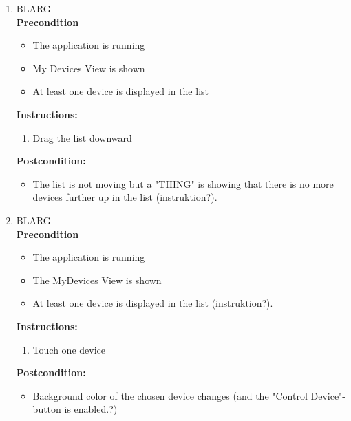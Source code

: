 \documentclass[a4paper]{article}
\newlength{\testlabellength}
\newenvironment{testlist}{\begin{enumerate}[label=\bfseries Instruction \thesubsection.\arabic* , labelindent=0pt, labelwidth=\testlabellength , leftmargin=2cm]}{\end{enumerate}}
\newenvironment{precondition}{
{\color{white}BLARG}\\ 
\textbf{Precondition}
\begin{itemize}[labelindent=0cm, labelwidth=2cm , leftmargin=1cm]
}
{\end{itemize}}
\newenvironment{instruction}{
\textbf{Instructions:}
\begin{enumerate}[label=\bfseries  \arabic*., labelindent=0cm, labelwidth=2cm , leftmargin=1cm]
}
{\end{enumerate}}
\newenvironment{postcondition}{
\textbf{Postcondition:}
\begin{itemize}[labelindent=0cm, labelwidth=2cm , leftmargin=1cm]
}
{\end{itemize}}
\begin{document}
\begin{appendices}
\begin{testlist}
    \item	
    	\begin{precondition}
    		\item The application is running 
    		\item My Devices View is shown
    		\item At least one device is displayed in the list
    	\end{precondition}
    	\begin{instruction}
			\item Drag the list downward
		\end{instruction}
		\begin{postcondition}
			\item The list is not moving but a "THING" is showing that there is no more devices further up in the list (instruktion?).
		\end{postcondition}
    
    \item
    	\begin{precondition}
    		\item The application is running
    		\item The MyDevices View is shown
    		\item At least one device is displayed in the list (instruktion?).
    	\end{precondition}
		\begin{instruction}
			\item Touch one device
		\end{instruction}
		\begin{postcondition}
			\item Background color of the chosen device changes (and the "Control Device"-button is enabled.?)
		\end{postcondition}
    

\end{testlist}
\end{appendices}
\end{document}
